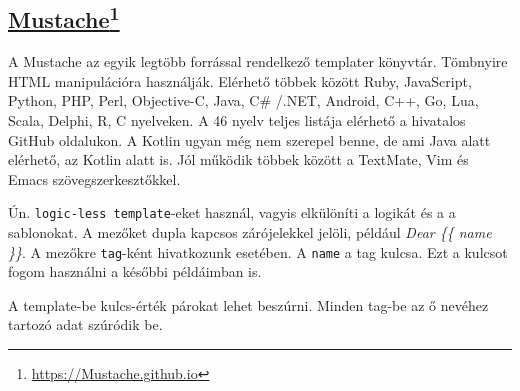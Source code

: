 \subsection[Mustache]{\href{https://Mustache.github.io}{Mustache}\footnote{\url{https://Mustache.github.io}}}
\label{sec:Mustache}
A Mustache az egyik legtöbb forrással rendelkező templater könyvtár.
Tömbnyire HTML manipulációra használják.
Elérhető többek között Ruby, JavaScript, Python, PHP, Perl, Objective-C, Java, C\# /.NET, Android, C++, Go, Lua, Scala, Delphi, R, C nyelveken.
A 46 nyelv teljes listája elérhető a hivatalos GitHub oldalukon.
A Kotlin ugyan még nem szerepel benne, de ami Java alatt elérhető, az Kotlin alatt is.
Jól működik többek között a TextMate, Vim és Emacs szövegszerkesztőkkel.

Ún. \texttt{logic-less template}-eket használ, vagyis elkülöníti a logikát és a a sablonokat.
A mezőket dupla kapcsos zárójelekkel jelöli, például \textit{Dear \{\{ name \}\}}.
A mezőkre \texttt{tag}-ként hivatkozunk esetében.
A \texttt{name} a tag kulcsa.
Ezt a kulcsot fogom használni a későbbi példáimban is.

A template-be kulcs-érték párokat lehet beszúrni.
Minden tag-be az ő nevéhez tartozó adat szúródik be.

